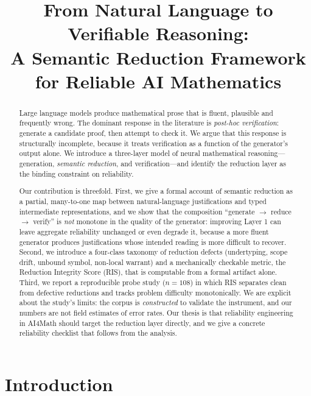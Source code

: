 \documentclass[11pt,a4paper]{article}
\theoremstyle{plain}
\theoremstyle{definition}
\newcommand{\RIS}{\textnormal{\textsc{RIS}}}
\begin{document}
\title{\vspace{-1.2cm}\bfseries From Natural Language to Verifiable Reasoning:\\
A Semantic Reduction Framework for Reliable AI Mathematics}
\author{}\date{}

\begin{abstract}
Large language models produce mathematical prose that is fluent, plausible
and frequently wrong. The dominant response in the literature is
\emph{post-hoc verification}: generate a candidate proof, then attempt to
check it. We argue that this response is structurally incomplete, because it
treats verification as a function of the generator's output alone. We
introduce a three-layer model of neural mathematical reasoning---generation,
\emph{semantic reduction}, and verification---and identify the reduction
layer as the binding constraint on reliability.

Our contribution is threefold. First, we give a formal account of semantic
reduction as a partial, many-to-one map between natural-language
justifications and typed intermediate representations, and we show that
the composition ``generate $\rightarrow$ reduce $\rightarrow$ verify'' is
\emph{not} monotone in the quality of the generator: improving Layer 1 can
leave aggregate reliability unchanged or even degrade it, because a more
fluent generator produces justifications whose intended reading is more
difficult to recover. Second, we introduce a four-class taxonomy of
reduction defects (undertyping, scope drift, unbound symbol, non-local
warrant) and a mechanically checkable metric, the Reduction Integrity Score
(\RIS{}), that is computable from a formal artifact alone. Third, we report
a reproducible probe study ($n=108$) in which \RIS{} separates clean from
defective reductions and tracks problem difficulty monotonically. We are
explicit about the study's limits: the corpus is \emph{constructed} to
validate the instrument, and our numbers are not field estimates of error
rates. Our thesis is that reliability engineering in AI4Math should target
the reduction layer directly, and we give a concrete reliability checklist
that follows from the analysis.
\end{abstract}

\section{Introduction}
\label{sec:intro}
\end{document}
